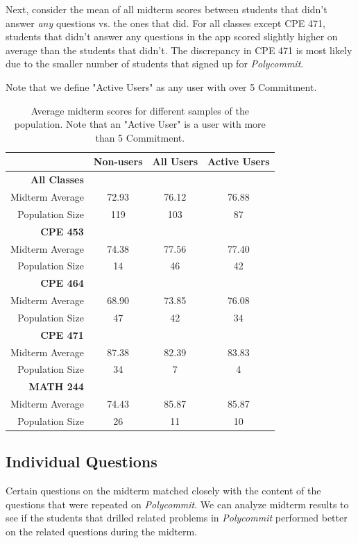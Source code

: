  \par Next, consider the mean of all midterm scores between students that didn't answer \textit{any} questions vs. the ones that did. For all classes except CPE 471, students that didn't answer any questions in the app scored slightly higher on average than the students that didn't. The discrepancy in CPE 471 is most likely due to the smaller number of students that signed up for \textit{Polycommit}.
 
 \par Note that we define "Active Users" as any user with over 5 Commitment. 
  
  \begin{table}
 \begin{tabular}[h]{ r c c c}
  & \textbf{Non-users} & \textbf{All Users} & \textbf{Active Users} \\
  \hline
  \textbf{All Classes} & & & \\
  Midterm Average & 72.93 & 76.12 & 76.88 \\
  Population Size & 119 & 103 & 87 \\
  \hline
  \textbf{CPE 453} & & & \\
 Midterm Average & 74.38 & 77.56 & 77.40 \\
 Population Size & 14 & 46 & 42 \\
 \hline
 \textbf{CPE 464} & & & \\
 Midterm Average & 68.90 & 73.85 & 76.08 \\
 Population Size & 47 & 42 & 34 \\
 \hline
 \textbf{CPE 471} & & & \\
 Midterm Average & 87.38 & 82.39 & 83.83 \\
 Population Size & 34 & 7 & 4 \\
 \hline
 \textbf{MATH 244} & & & \\
 Midterm Average & 74.43 & 85.87 & 85.87 \\
 Population Size & 26 & 11 & 10 \\
 
\end{tabular}
\caption{Average midterm scores for different samples of the population. Note that an "Active User" is a user with more than 5 Commitment.}
\end{table}

\subsection{Individual Questions}
Certain questions on the midterm matched closely with the content of the questions that were repeated on \textit{Polycommit}. We can analyze midterm results to see if the students that drilled related problems in \textit{Polycommit} performed better on the related questions during the midterm.

